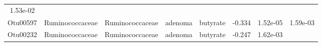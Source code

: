 \documentclass[11pt,]{article}
\begin{document}
\begin{longtable}[]{@{}cccccccc@{}}
\begin{minipage}[t]{0.08\columnwidth}
1.53e-02\strut
\end{minipage}\tabularnewline
\begin{minipage}[t]{0.08\columnwidth}\centering\strut
Otu00597\strut
\end{minipage} & \begin{minipage}[t]{0.15\columnwidth}\centering\strut
Ruminococcaceae\strut
\end{minipage} & \begin{minipage}[t]{0.15\columnwidth}\centering\strut
Ruminococcaceae\strut
\end{minipage} & \begin{minipage}[t]{0.08\columnwidth}\centering\strut
adenoma\strut
\end{minipage} & \begin{minipage}[t]{0.09\columnwidth}\centering\strut
butyrate\strut
\end{minipage} & \begin{minipage}[t]{0.07\columnwidth}\centering\strut
-0.334\strut
\end{minipage} & \begin{minipage}[t]{0.08\columnwidth}\centering\strut
1.52e-05\strut
\end{minipage} & \begin{minipage}[t]{0.08\columnwidth}\centering\strut
1.59e-03\strut
\end{minipage}\tabularnewline
\begin{minipage}[t]{0.08\columnwidth}\centering\strut
Otu00232\strut
\end{minipage} & \begin{minipage}[t]{0.15\columnwidth}\centering\strut
Ruminococcaceae\strut
\end{minipage} & \begin{minipage}[t]{0.15\columnwidth}\centering\strut
Ruminococcaceae\strut
\end{minipage} & \begin{minipage}[t]{0.08\columnwidth}\centering\strut
adenoma\strut
\end{minipage} & \begin{minipage}[t]{0.09\columnwidth}\centering\strut
butyrate\strut
\end{minipage} & \begin{minipage}[t]{0.07\columnwidth}\centering\strut
-0.247\strut
\end{minipage} & \begin{minipage}[t]{0.08\columnwidth}\centering\strut
1.62e-03\strut
\end{minipage} & \begin{minipage}[t]{0.08\columnwidth}\centering\strut

\end{minipage}
\end{longtable}
\end{document}

